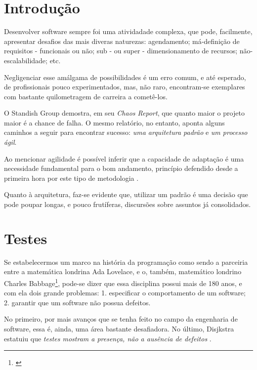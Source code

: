   \section{Introdução}

    Desenvolver software sempre foi uma atividadade complexa, que pode,
    facilmente,  apresentar desafios das mais diveras naturezas: agendamento;
    má-definição de  requisitos - funcionais ou não; sub - ou super -
    dimensionamento de recursos; não-escalabilidade; etc.

    Negligenciar esse amálgama de possibilidades é um erro comum, e até
    esperado, de profissionais pouco experimentados, mas, não raro,
    encontram-se exemplares com bastante quilometragem de carreira a
    cometê-los.

    O Standish Group demostra, em seu \emph{Chaos Report}\cite{ChaosReport2015},
    que quanto maior o projeto maior é a chance de falha. O mesmo relatório, no
    entanto, aponta alguns caminhos a seguir para encontrar sucesso: \emph{uma
    arquitetura padrão} e \emph{um processo ágil}.

    Ao mencionar agilidade é possível inferir que a capacidade de adaptação é
    uma  necessidade fundamental para o bom andamento, princípio defendido desde
    a  primeira hora por este tipo de metodologia \cite{ManifestoAgil2001}.

    Quanto à  arquitetura, faz-se evidente que, utilizar um padrão é uma decisão
    que  pode poupar longas, e pouco frutíferas, discursões sobre assuntos já
    consolidados.


  \section{Testes}

    Se estabelecermos um marco na história da programação como sendo a parceiria
    entre a matemática londrina Ada Lovelace, e o, também, matemático londrino
    Charles Babbage\footnote{\cite{Huskey1980}}, pode-se dizer que essa
    disciplina possui mais de 180 anos, e com ela dois grande problemas: 1.
    especificar o comportamento de um software; 2. garantir que um software não
    possua defeitos.

    No primeiro, por mais avanços que se tenha feito no campo da engenharia de
    software, essa é, ainda, uma área bastante desafiadora. No último, Disjkstra
    estatuiu que \emph{testes mostram a presença, não a ausência de defeitos}
    \cite[pág. 16]{Nato1969}.

